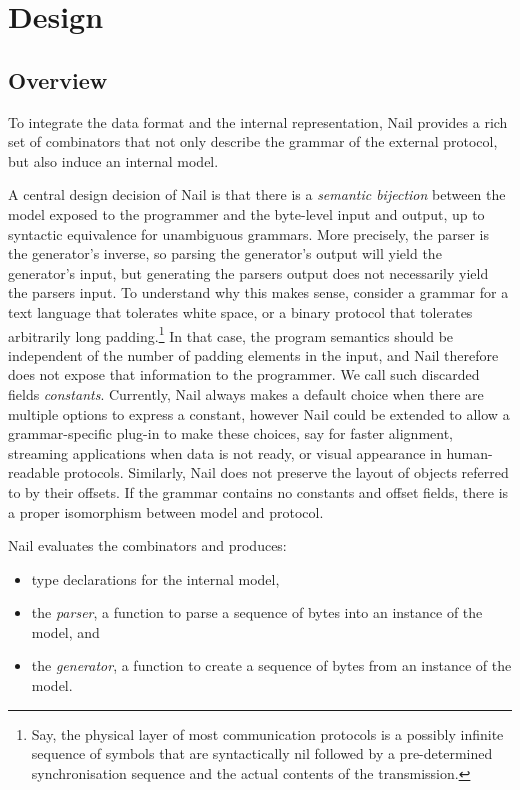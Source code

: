 \section{Design}
\label{s:design}

\subsection{Overview}

To integrate the data format and the internal representation, Nail
provides a rich set of combinators that not
only describe the grammar of the external protocol, but also induce an internal
model.

A central design decision of Nail is that there is a \emph{semantic bijection} between
the model exposed to the programmer and the byte-level input and output, up to
syntactic equivalence for unambiguous grammars. More precisely, the parser is
the generator's inverse, so parsing the generator's output will yield the
generator's input, but generating the parsers output does not necessarily yield
the parsers input. To understand why this makes sense, consider a grammar for a
text language that tolerates white space, or a binary protocol that tolerates
arbitrarily long padding.\footnote{Say, the physical layer of most communication
  protocols is a possibly infinite sequence of symbols that are syntactically
  nil followed by a pre-determined synchronisation sequence and the actual
  contents of the transmission.} In that case, the program semantics should be
independent of the number of padding elements in the input, and Nail therefore
does not expose that information to the programmer. We call such discarded
fields \emph{constants}. Currently, Nail always makes a default choice when
there are multiple options to express a constant, however Nail could be extended
to allow a grammar-specific plug-in to make these choices, say for faster
alignment, streaming applications when data is not ready, or visual appearance in
human-readable protocols. Similarly, Nail does not preserve the layout of
objects referred to by their offsets. If the grammar contains no constants and
offset fields, there is a proper isomorphism between model and protocol.


Nail evaluates the combinators and produces:

\begin{itemize}
\item type declarations for the internal model,
\item the \textit{parser}, a function to parse a sequence of bytes into an
instance of the model, and
\item the \textit{generator}, a function to create a
sequence of bytes from an instance of the model.
\end{itemize}


